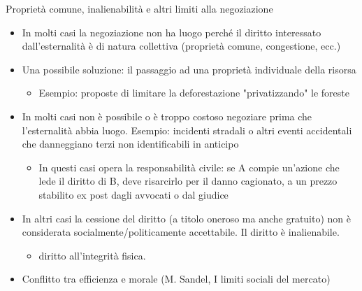 \documentclass[aspectratio=64,11pt]{beamer}
\begin{document}
\begin{frame}{Proprietà comune, inalienabilità e altri limiti alla negoziazione}
\begin{itemize}
\item In molti casi la negoziazione non ha luogo perché il diritto interessato
dall'esternalità è di natura collettiva (proprietà comune, congestione,
ecc.)
\item Una possibile soluzione: il passaggio ad una proprietà individuale della
risorsa
\begin{itemize}
\item Esempio: proposte di limitare la deforestazione "privatizzando" le foreste
\end{itemize}
\item In molti casi non è possibile o è troppo costoso negoziare prima che
l'esternalità abbia luogo. Esempio: incidenti stradali o altri eventi
accidentali che danneggiano terzi non identificabili in anticipo
\begin{itemize}
\item In questi casi opera la responsabilità civile: se A compie un'azione che
lede il diritto di B, deve risarcirlo per il danno cagionato, a un prezzo
stabilito ex post dagli avvocati o dal giudice
\end{itemize}
\item In altri casi la cessione del diritto (a titolo oneroso ma anche gratuito)
non è considerata socialmente/politicamente accettabile. Il diritto è
inalienabile.
\begin{itemize}
\item diritto all'integrità fisica.
\end{itemize}
\item Conflitto tra efficienza e morale (M. Sandel, I limiti sociali del mercato)
\end{itemize}
\end{frame}
\end{document}
